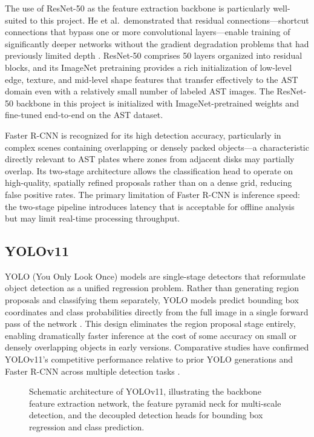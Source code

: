 The use of ResNet-50 as the feature extraction backbone is particularly well-suited to this
project. He et al.\ demonstrated that residual connections---shortcut connections that bypass
one or more convolutional layers---enable training of significantly deeper networks without
the gradient degradation problems that had previously limited depth \cite{he2016deep}. ResNet-50
comprises 50 layers organized into residual blocks, and its ImageNet pretraining provides a
rich initialization of low-level edge, texture, and mid-level shape features that transfer
effectively to the AST domain even with a relatively small number of labeled AST images.
The ResNet-50 backbone in this project is initialized with ImageNet-pretrained weights and
fine-tuned end-to-end on the AST dataset.

Faster R-CNN is recognized for its high detection accuracy, particularly in complex scenes
containing overlapping or densely packed objects---a characteristic directly relevant to AST
plates where zones from adjacent disks may partially overlap. Its two-stage architecture
allows the classification head to operate on high-quality, spatially refined proposals rather
than on a dense grid, reducing false positive rates. The primary limitation of Faster R-CNN
is inference speed: the two-stage pipeline introduces latency that is acceptable for offline
analysis but may limit real-time processing throughput.

\subsection{YOLOv11}

YOLO (You Only Look Once) models are single-stage detectors that reformulate object detection
as a unified regression problem. Rather than generating region proposals and classifying them
separately, YOLO models predict bounding box coordinates and class probabilities directly from
the full image in a single forward pass of the network \cite{wang2024yolov11,khanam2024yolov11}.
This design eliminates the region proposal stage entirely, enabling dramatically faster inference
at the cost of some accuracy on small or densely overlapping objects in early versions.
Comparative studies have confirmed YOLOv11's competitive performance relative to prior YOLO
generations and Faster R-CNN across multiple detection tasks \cite{sharma2024yolo_comparison}.

\begin{figure}[H]
  \centering
  \caption{Schematic architecture of YOLOv11, illustrating the backbone feature extraction
    network, the feature pyramid neck for multi-scale detection, and the decoupled detection
    heads for bounding box regression and class prediction.}
  \label{fig:yolov11}
\end{figure}

